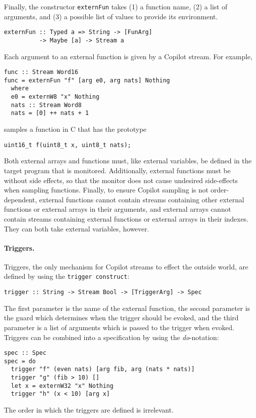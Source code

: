 Finally, the constructor \texttt{externFun} takes (1) a function name, (2) a
list of arguments, and (3) a possible list of values to provide its environment.
%
\begin{lstlisting}
externFun :: Typed a => String -> [FunArg] 
          -> Maybe [a] -> Stream a
\end{lstlisting}
%
Each argument to an external function is given by a Copilot stream.  For
example,
%
\begin{lstlisting}[frame=single]
func :: Stream Word16
func = externFun "f" [arg e0, arg nats] Nothing
  where
  e0 = externW8 "x" Nothing
  nats :: Stream Word8
  nats = [0] ++ nats + 1
\end{lstlisting} 
samples a function in C that has the prototype
%
\begin{lstlisting}
uint16_t f(uint8_t x, uint8_t nats);
\end{lstlisting}
% 

Both external arrays and functions must, like external variables, be defined
in the target program that is monitored. Additionally, external functions must be
without side effects, so that the monitor does not cause undesired side-effects when
sampling functions.  Finally, to ensure Copilot sampling is not
order-dependent, external functions cannot contain streams containing other
external functions or external arrays in their arguments, and external arrays
cannot contain streams containing external functions or external arrays in their
indexes.  They can both take external variables, however.

\paragraph{Triggers.}
Triggers, the only mechanism for Copilot streams to effect the outside world,
are defined by using the {\tt trigger construct}:
%
\begin{lstlisting}[frame=single]
trigger :: String -> Stream Bool -> [TriggerArg] -> Spec
\end{lstlisting}
%
The first parameter is the name of the external function, the second parameter is the
guard which determines when the trigger should be evoked, and the third parameter
is a list of arguments which is passed to the trigger when evoked.
Triggers can be combined into a specification by using the \emph{do}-notation:
%
\begin{lstlisting}[frame=single]
spec :: Spec
spec = do
  trigger "f" (even nats) [arg fib, arg (nats * nats)]
  trigger "g" (fib > 10) []
  let x = externW32 "x" Nothing
  trigger "h" (x < 10) [arg x]
\end{lstlisting}
%
The order in which the triggers are defined is irrelevant.

